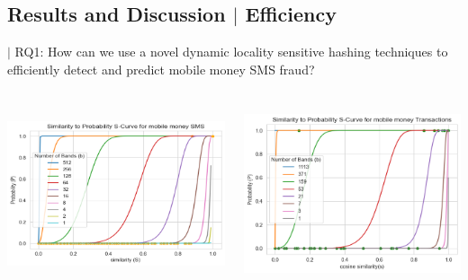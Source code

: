 \documentclass[11pt,aspectratio=169]{beamer}
\begin{document}
			\subsection{Results and Discussion $|$ Efficiency}
			\begin{frame}{$|$ \footnotesize{RQ1: How can we use a novel dynamic locality sensitive hashing techniques to efficiently detect and predict         mobile money SMS fraud?}}
				\begin{columns}
					
						\includegraphics[width=225pt, height=150pt]{assets/smseff.png}
						
					
						
						\includegraphics[width=225pt, height=150pt]{assets/transeff.png}
					
				\end{columns}
			\end{frame}
		

		
\end{document}
